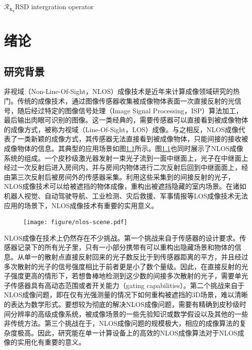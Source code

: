 \documentclass[master]{shtthesis}             %
\begin{document}
\begin{nomenclatures}[算子 \& 说明]
  \item{$\mathcal{R}_{\mathbf{x_v}}$}{RSD intergration operator}
\end{nomenclatures}
\fi

\mainmatter
\chapter{绪论}

\section{研究背景}\label{sec:backgd}

非视域（Non-Line-Of-Sight，NLOS）成像技术是近年来计算成像领域研究的热门。传统的成像技术，通过图像传感器收集被成像物体表面一次直接反射的光信号，随后经过特定的图像信号处理（Image Signal Processing，ISP）算法加工，最后输出肉眼可识别的图像。这一类经典的，需要传感器可以直接看到被成像物体的成像方式，被称为视域（Line-Of-Sight，LOS）成像。与之相反，NLOS成像代表了一类新颖的成像方式，其传感器无法直接看到被成像物体，只能间接的接收被成像物体的信息。其典型的应用场景如图\ref{fig:nlos_scene}所示。图\ref{fig:nlos_scene}也同时展示了NLOS成像系统的组成。一个皮秒级激光器发射一束光子流到一面中继面上，光子在中继面上经过一次反射后进入房间内，并与房间内物体进行二次反射后回到中继面面上，经由第三次反射后被房间外的传感器采集。利用这些采集到的间接反射的光子，NLOS成像技术可以给被遮挡的物体成像，重构出被遮挡隐藏的室内场景。在诸如机器人视觉、自动驾驶导航、工业检测、灾后救援、军事情报等LOS成像技术无法应用的场景下，NLOS成像技术有重要的实用意义。%

\begin{figure}[tb]
  \centering
  \texttt{[image: figure/nlos-scene.pdf]}
  \label{fig:nlos_scene}
\end{figure}

NLOS成像在技术上仍然存在不少挑战。第一个挑战来自于传感器的设计要求。传感器记录下的所有光子里，只有一小部分携带有可以重构出隐藏场景和物体的信息。从单一的散射点直接反射回来的光子数反比于到传感器距离的平方，并且经过多次散射的光子的信号强度相比于前者更是小了数个量级。因此，在直接反射的光子强度更高的情形下，若想鲁棒地检测到这少数的间接多次散射的光子，需要单光子传感器具有高动态范围或者开关能力（gating capabilities）。第二个挑战来自于NLOS成像问题，即在仅有光强测量的情况下如何重构被遮挡的3D场景，难以清晰的表达为数学形式。要想较为彻底的解决NLOS成像问题，需要有精确到皮秒级时间分辨率的高级成像系统，被成像场景的一些先验知识或数学假设以及其他的一些非传统方法。第三个挑战在于，NLOS成像问题的规模极大，相应的成像算法的复杂度极高。因此，研究能在单一计算设备上的高效的NLOS成像算法对于NLOS成像的实用化有重要的意义。
\end{document}
